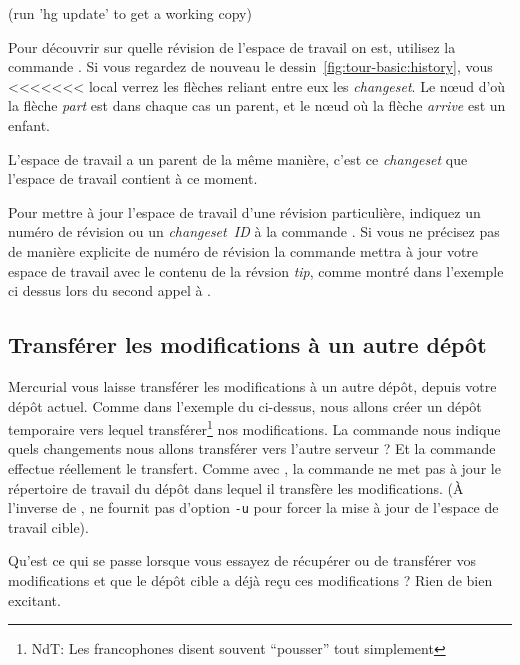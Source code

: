 \begin{codesample2}
  (run 'hg update' to get a working copy)
\end{codesample2}

Pour découvrir sur quelle révision de l'espace de travail on est, utilisez
la commande . 
Si vous regardez de nouveau le dessin~\ref{fig:tour-basic:history}, vous
<<<<<<< local
verrez les flèches reliant entre eux les \textit{changeset}. Le nœud 
d'où la flèche \emph{part} est dans chaque cas un parent, 
et le nœud où la flèche \emph{arrive} est un enfant. 

L'espace de travail a un parent de la même manière, c'est ce \textit{changeset} 
que l'espace de travail contient à ce moment.

Pour mettre à jour l'espace de travail d'une révision particulière, 
indiquez un numéro de révision ou un \textit{changeset~ID} à la commande 
.
Si vous ne précisez pas de manière explicite de numéro de révision
la commande  mettra à jour votre espace de travail avec
le contenu de la révsion \textit{tip}, comme montré dans l'exemple 
ci dessus lors du second appel à .

\subsection{Transférer les modifications à un autre dépôt}

Mercurial vous laisse transférer les modifications à un autre
dépôt, depuis votre dépôt actuel. Comme dans l'exemple du 
 ci-dessus, nous allons créer un dépôt temporaire
vers lequel transférer\footnote{NdT: Les francophones disent souvent 
``pousser'' tout simplement} nos modifications.
La commande  nous indique quels changements nous
allons transférer vers l'autre serveur ?
Et la commande  effectue réellement le transfert.
Comme avec , la commande  ne met pas à jour
le répertoire de travail du dépôt dans lequel il transfère les 
modifications. (À l'inverse de ,  ne fournit
pas d'option \texttt{-u} pour forcer la mise à jour de l'espace
de travail cible).

Qu'est ce qui se passe lorsque vous essayez de récupérer ou de transférer
vos modifications et que le dépôt cible a déjà reçu ces modifications ? 
Rien de bien excitant.

